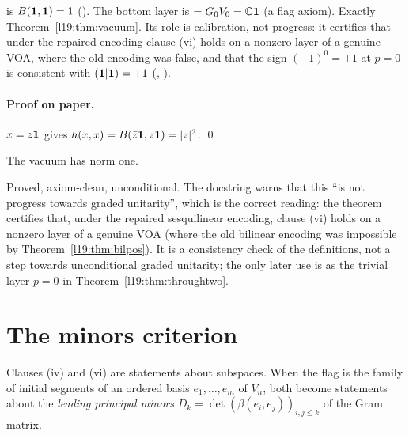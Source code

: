 \begin{dictionary}
 is $B(\mathbf{1},\mathbf{1}) = 1$ ().
The bottom layer is  $= G_0V_0 = {\mathbb{C}}\mathbf{1}$ (a flag axiom). Exactly
Theorem~\ref{l19:thm:vacuum}. Its role is calibration, not progress: it certifies that under the
repaired encoding clause (vi) holds on a nonzero layer of a genuine VOA, where the old encoding was
false, and that the sign $(-1)^0 = +1$ at $p=0$ is consistent with $(\mathbf{1}|\mathbf{1}) = +1$
(\allowbreak{}\allowbreak{}, ).
\end{dictionary}

\paragraph{Proof on paper.} $x = z\mathbf{1}$ gives $h(x,x) = B(\bar z\mathbf{1},z\mathbf{1}) =
|z|^2$. \qed

\begin{physics}
The vacuum has norm one.
\end{physics}

\begin{status}
Proved, axiom-clean, unconditional. The docstring warns that this ``is not progress towards graded
unitarity'', which is the correct reading: the theorem certifies that, under the repaired sesquilinear
encoding, clause (vi) holds on a nonzero layer of a genuine VOA (where the old bilinear encoding was
impossible by Theorem~\ref{l19:thm:bilpos}). It is a consistency check of the definitions, not a step towards
unconditional graded unitarity; the only later use is as the trivial layer $p = 0$ in
Theorem~\ref{l19:thm:throughtwo}.
\end{status}

\section{The minors criterion}\label{l19:sec:minors}

Clauses (iv) and (vi) are statements about subspaces. When the flag is the family of initial
segments of an ordered basis $e_1,\dots,e_m$ of $V_n$, both become statements about the
\emph{leading principal minors} $D_k = \det(\beta(e_i,e_j))_{i,j\le k}$ of the Gram matrix.

